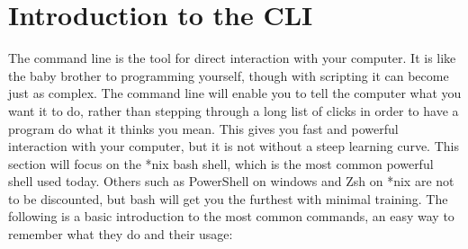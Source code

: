 	\section{Introduction to the CLI}
		The command line is the tool for direct interaction with your computer. 
		It is like the baby brother to programming yourself, though with scripting it can become just as complex. 
		The command line will enable you to tell the computer what you want it to do, rather than stepping through a long list of clicks in order to have a program do what it thinks you mean. 
		This gives you fast and powerful interaction with your computer, but it is not without a steep learning curve. 
		This section will focus on the \**nix bash shell, which is the most common powerful shell used today. 
		Others such as PowerShell on windows and Zsh on \**nix are not to be discounted, but bash will get you the furthest with minimal training.\cite{CLICrashCourse}
		The following is a basic introduction to the most common commands, an easy way to remember what they do and their usage:
